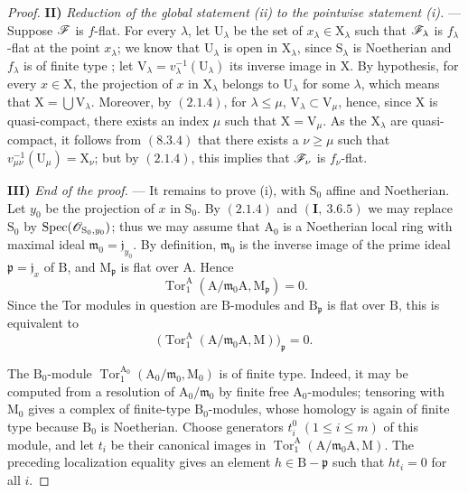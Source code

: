 \begin{proof}
\medskip
\noindent\textbf{II)} \emph{Reduction of the global statement (ii) to the pointwise statement (i).} --- Suppose $\mathscr{F}$ is $f$-flat. For every $\lambda$, let $\mathrm{U}_\lambda$ be the set of $x_\lambda\in\mathrm{X}_\lambda$ such that $\mathscr{F}_\lambda$ is $f_\lambda$-flat at the point $x_\lambda$; we know that $\mathrm{U}_\lambda$ is open in $\mathrm{X}_\lambda$, since $\mathrm{S}_\lambda$ is Noetherian and $f_\lambda$ is of finite type ; let $\mathrm{V}_\lambda=v_\lambda^{-1}(\mathrm{U}_\lambda)$ its inverse image in $\mathrm{X}$. By hypothesis, for every $x\in\mathrm{X}$, the projection of $x$ in $\mathrm{X}_\lambda$ belongs to $\mathrm{U}_\lambda$ for some $\lambda$, which means that $\mathrm{X}=\bigcup\mathrm{V}_\lambda$. Moreover, by $(2.1.4)$, for $\lambda\leqslant\mu$, $\mathrm{V}_\lambda\subset\mathrm{V}_\mu$, hence, since $\mathrm{X}$ is quasi-compact, there exists an index $\mu$ such that $\mathrm{X}=\mathrm{V}_\mu$. As the $\mathrm{X}_\lambda$ are quasi-compact, it follows from $(8.3.4)$ that there exists a $\nu\geqslant\mu$ such that $v_{\mu\nu}^{-1}(\mathrm{U}_\mu)=\mathrm{X}_\nu$; but by $(2.1.4)$, this implies that $\mathscr{F}_\nu$ is $f_\nu$-flat.

\medskip
\noindent\textbf{III)} \emph{End of the proof.} --- It remains to prove
(i), with $\mathrm S_0$ affine and Noetherian. Let $y_0$ be the
projection of $x$ in $\mathrm S_0$. By $(2.1.4)$ and
$(\mathbf I,~3.6.5)$ we may replace $\mathrm S_0$ by
$\operatorname{Spec}(\mathscr{O}_{\mathrm S_0,y_0})$; thus we may assume that
$\mathrm A_0$ is a Noetherian local ring with maximal ideal
$\mathfrak m_0=\mathfrak j_{y_0}$. By definition,
$\mathfrak m_0$ is the inverse image of the prime ideal
$\mathfrak p=\mathfrak j_x$ of $\mathrm B$, and
$\mathrm M_{\mathfrak p}$ is flat over $\mathrm A$. Hence
\[
  \operatorname{Tor}_1^\mathrm A
  (\mathrm A/\mathfrak m_0\mathrm A,\mathrm M_{\mathfrak p})=0.
\]
Since the Tor modules in question are $\mathrm B$-modules and
$\mathrm B_{\mathfrak p}$ is flat over $\mathrm B$, this is equivalent
to
\[
  \bigl(\operatorname{Tor}_1^\mathrm A
  (\mathrm A/\mathfrak m_0\mathrm A,\mathrm M)\bigr)_{\mathfrak p}=0.
\]

The $\mathrm B_0$-module
$\operatorname{Tor}_1^{\mathrm A_0}
(\mathrm A_0/\mathfrak m_0,\mathrm M_0)$ is of finite type. Indeed, it
may be computed from a resolution of $\mathrm A_0/\mathfrak m_0$ by
finite free $\mathrm A_0$-modules; tensoring with $\mathrm M_0$ gives a
complex of finite-type $\mathrm B_0$-modules, whose homology is again
of finite type because $\mathrm B_0$ is Noetherian. Choose generators
$t_i^0$ $(1\leqslant i\leqslant m)$ of this module, and let $t_i$ be
their canonical images in
$\operatorname{Tor}_1^\mathrm A
(\mathrm A/\mathfrak m_0\mathrm A,\mathrm M)$. The preceding
localization equality gives an element
$h\in\mathrm B-\mathfrak p$ such that $ht_i=0$ for all $i$.


\end{proof}

